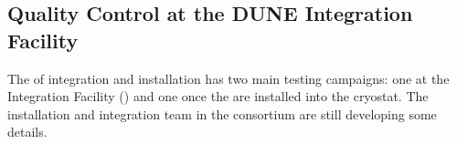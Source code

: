 \begin{comment}
Finally, when the two \dwords{apa} are fully cabled, they are placed onto the DSS inside the cryostat (see bottom right of Figure~\ref{fig:handling}) and moved to their location in the cryostat where final integration tests are performed.  For more information on the detector support structure and installation into the cryostat, see %
Chapter~\ref{ch:fdsp-coord}. 

\begin{dunefigure}[Underground handling of the \dwords{apa}]{fig:handling}{(Top row) Handling of an \dword{apa} in the underground storage area where the \dwords{apa} are extracted from the crates, inspected, and readied for installation in the cryostat. (Bottom row) A pair of \dwords{apa} are brought into the space just outside the \dword{tco} to be linked and cabled, then connected to the \dword{dss} and moved into their final position inside the cryostat.}
\setlength{\fboxsep}{0pt}
\setlength{\fboxrule}{0.5pt}
\centering
\fbox{\texttt{[image: sp-apa-install-1.png]}} 
\fbox{\texttt{[image: sp-apa-install-2.png]}} 
\fbox{\texttt{[image: sp-apa-install-3.png]}} 
\\ \vspace*{1.5mm}
\hspace*{-.25mm}
\fbox{\texttt{[image: sp-apa-install-4.png]}}
\hspace*{1.mm}
\fbox{\texttt{[image: sp-apa-install-5.png]}}
\end{dunefigure}
\end{comment}

\subsection{Quality Control at the DUNE Integration Facility}
\label{sec:fdsp-apa-transport-qc}

The  of integration and installation has two main testing campaigns: one at the Integration Facility ()  and one once the  are installed into the cryostat. The installation and integration team in the  consortium are still developing some details. 

